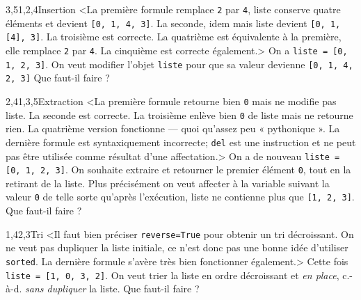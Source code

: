 \begin{quiz}[title={Listes}]
\vspace{-\baselineskip}
\begin{quizquestion}[b]{3,5}{1,2,4}{Insertion}
<La première formule remplace \texttt{2} par \texttt{4}, liste conserve quatre éléments et devient \texttt{[0, 1, 4, 3]}.
La seconde, idem mais liste devient \texttt{[0, 1, [4], 3]}.
La troisième est correcte.
La quatrième est équivalente à la première, elle remplace \texttt{2} par \texttt{4}.
La cinquième est correcte également.> 
On a \texttt{liste = [0, 1, 2, 3]}. On veut modifier l'objet \texttt{liste} pour que sa valeur devienne \texttt{[0, 1, 4, 2, 3]}
Que faut-il faire ? %
\end{quizquestion}

\begin{quizquestion}[b]{2,4}{1,3,5}{Extraction}
<La première formule retourne bien \texttt{0} mais ne modifie pas liste. La seconde est correcte. La troisième enlève bien \texttt{0} de liste mais ne retourne rien. La quatrième version fonctionne --- quoi qu'assez peu « pythonique ». La dernière formule est syntaxiquement incorrecte; \texttt{del} est une instruction et ne peut pas être utilisée comme résultat d'une affectation.> 
On a de nouveau \texttt{liste = [0, 1, 2, 3]}. On souhaite extraire et retourner le premier élément \texttt{0}, tout en la retirant de la liste. Plus précisément on veut affecter à la variable suivant la valeur \texttt{0} de telle sorte qu'après l'exécution, liste ne contienne plus que \texttt{[1, 2, 3]}.
Que faut-il faire ?%
\end{quizquestion}

\begin{quizquestion}[b]{1,4}{2,3}{Tri}
<Il faut bien préciser \texttt{reverse=True} pour obtenir un tri décroissant. On ne veut pas dupliquer la liste initiale, ce n'est donc pas une bonne idée d'utiliser \texttt{sorted}. La dernière formule s'avère très bien fonctionner également.> 
Cette fois \texttt{liste = [1, 0, 3, 2]}. On veut trier la liste en ordre décroissant et \emph{en place}, c.-à-d. \emph{sans dupliquer} la liste. Que faut-il faire ?%
\end{quizquestion}
\end{quiz}

